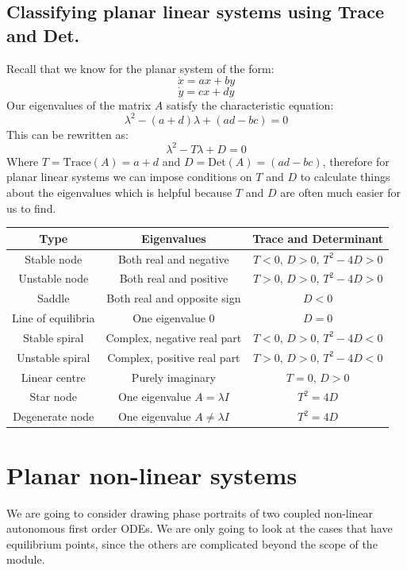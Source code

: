 \documentclass[12pt]{article}
\begin{document}
\subsection*{Classifying planar linear systems using Trace and Det.}
Recall that we know for the planar system of the form:
\[\dot{x}=ax+by\]
\[\dot{y}=cx+dy\]
Our eigenvalues of the matrix \(A\) satisfy the characteristic equation:
\[\lambda^2-(a+d)\lambda+(ad-bc)=0\]
This can be rewritten as:
\[\lambda^2-T\lambda+D=0\]
Where \(T=\text{Trace}(A)=a+d\) and \(D=\text{Det}(A)=(ad-bc)\), therefore for planar linear systems we can impose conditions on \(T\) and \(D\) to calculate things about the eigenvalues which is helpful because \(T\) and \(D\) are often much easier for us to find.
\begin{table}[h]
    \begin{tabular}{|c|c|c|}
        \hline
        \textbf{Type} & \textbf{Eigenvalues} & \textbf{Trace and Determinant}  \\ \hline
        Stable node & Both real and negative & \(T<0,\,D>0,\,T^2-4D>0\) \\ \hline
        Unstable node & Both real and positive & \(T>0,\, D>0,\,T^2-4D>0\) \\ \hline
        Saddle & Both real and opposite sign & \(D<0\) \\ \hline
        Line of equilibria & One eigenvalue \(0\) & \(D=0\) \\ \hline
        Stable spiral & Complex, negative real part & \(T<0,\,D>0,\,T^2-4D<0\) \\ \hline
        Unstable spiral & Complex, positive real part & \(T>0,\,D>0,\,T^2-4D<0\) \\ \hline
        Linear centre & Purely imaginary & \(T=0,\, D>0\) \\ \hline
        Star node & One eigenvalue \(A=\lambda I\) & \(T^2=4D\) \\ \hline
        Degenerate node & One eigenvalue \(A\ne \lambda I\) & \(T^2=4D\) \\ \hline
    \end{tabular}
\end{table}
\section{Planar non-linear systems}
We are going to consider drawing phase portraits of two coupled non-linear autonomous first order ODEs. We are only going to look at the cases that have equilibrium points, since the others are complicated beyond the scope of the module.
\end{document}
